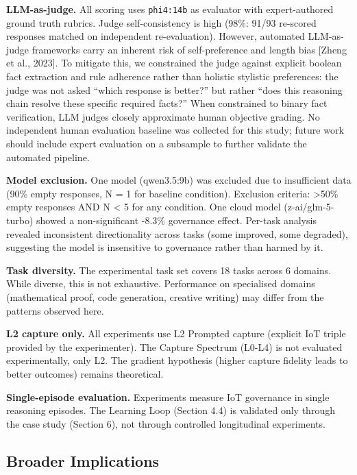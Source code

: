 \documentclass[11pt,a4paper]{article}
\begin{document}
\textbf{LLM-as-judge.} All scoring uses \texttt{phi4:14b} as evaluator
with expert-authored ground truth rubrics. Judge self-consistency is
high (98\%: 91/93 re-scored responses matched on independent
re-evaluation). However, automated LLM-as-judge frameworks carry an
inherent risk of self-preference and length bias {[}Zheng et al.,
2023{]}. To mitigate this, we constrained the judge against explicit
boolean fact extraction and rule adherence rather than holistic
stylistic preferences: the judge was not asked ``which response is
better?'' but rather ``does this reasoning chain resolve these specific
required facts?'' When constrained to binary fact verification, LLM
judges closely approximate human objective grading. No independent human
evaluation baseline was collected for this study; future work should
include expert evaluation on a subsample to further validate the
automated pipeline.

\textbf{Model exclusion.} One model (qwen3.5:9b) was excluded due to
insufficient data (90\% empty responses, N = 1 for baseline condition).
Exclusion criteria: \textgreater50\% empty responses AND N \textless{} 5
for any condition. One cloud model (z-ai/glm-5-turbo) showed a
non-significant -8.3\% governance effect. Per-task analysis revealed
inconsistent directionality across tasks (some improved, some degraded),
suggesting the model is insensitive to governance rather than harmed by
it.

\textbf{Task diversity.} The experimental task set covers 18 tasks
across 6 domains. While diverse, this is not exhaustive. Performance on
specialised domains (mathematical proof, code generation, creative
writing) may differ from the patterns observed here.

\textbf{L2 capture only.} All experiments use L2 Prompted capture
(explicit IoT triple provided by the experimenter). The Capture Spectrum
(L0-L4) is not evaluated experimentally, only L2. The gradient
hypothesis (higher capture fidelity leads to better outcomes) remains
theoretical.

\textbf{Single-episode evaluation.} Experiments measure IoT governance
in single reasoning episodes. The Learning Loop (Section 4.4) is
validated only through the case study (Section 6), not through
controlled longitudinal experiments.

\subsection{Broader Implications}\label{broader-implications}
\end{document}
